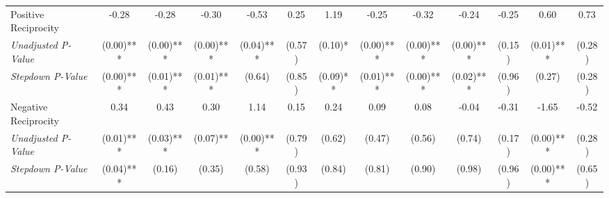 \begin{tabular}{l c c c c c c c c c c c c}
Positive Reciprocity & -0.28 & -0.28 & -0.30 & -0.53 & 0.25 & 1.19 & -0.25 & -0.32 & -0.24 & -0.25 & 0.60 & 0.73 \\
\quad \textit{Unadjusted P-Value} & (0.00)*** & (0.00)*** & (0.00)*** & (0.04)*** & (0.57) & (0.10)* & (0.00)*** & (0.00)*** & (0.00)*** & (0.15) & (0.01)*** & (0.28) \\
\quad \textit{Stepdown P-Value} & (0.00)*** & (0.01)*** & (0.01)*** & (0.64) & (0.85) & (0.09)** & (0.01)*** & (0.00)*** & (0.02)*** & (0.96) & (0.27) & (0.28) \\
Negative Reciprocity & 0.34 & 0.43 & 0.30 & 1.14 & 0.15 & 0.24 & 0.09 & 0.08 & -0.04 & -0.31 & -1.65 & -0.52 \\
\quad \textit{Unadjusted P-Value} & (0.01)*** & (0.03)*** & (0.07)** & (0.00)*** & (0.79) & (0.62) & (0.47) & (0.56) & (0.74) & (0.17) & (0.00)*** & (0.28) \\
\quad \textit{Stepdown P-Value} & (0.04)*** & (0.16) & (0.35) & (0.58) & (0.93) & (0.84) & (0.81) & (0.90) & (0.98) & (0.96) & (0.00)*** & (0.65) \\
\bottomrule
\end{tabular}
